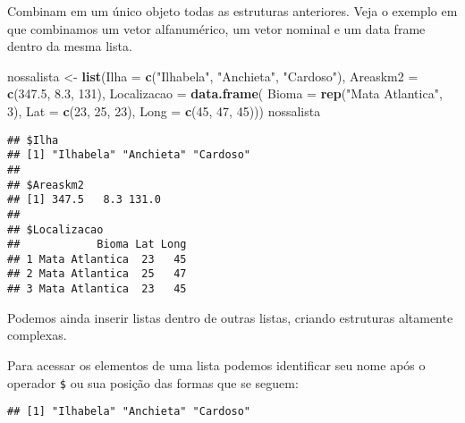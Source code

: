\documentclass[
]{book}
\newenvironment{Shaded}{\begin{snugshade}}{\end{snugshade}}
\newcommand{\DataTypeTok}[1]{\textcolor[rgb]{0.13,0.29,0.53}{#1}}
\newcommand{\DecValTok}[1]{\textcolor[rgb]{0.00,0.00,0.81}{#1}}
\newcommand{\FloatTok}[1]{\textcolor[rgb]{0.00,0.00,0.81}{#1}}
\newcommand{\KeywordTok}[1]{\textcolor[rgb]{0.13,0.29,0.53}{\textbf{#1}}}
\newcommand{\NormalTok}[1]{#1}
\newcommand{\OperatorTok}[1]{\textcolor[rgb]{0.81,0.36,0.00}{\textbf{#1}}}
\newcommand{\StringTok}[1]{\textcolor[rgb]{0.31,0.60,0.02}{#1}}
\begin{document}
Combinam em um único objeto todas as estruturas anteriores. Veja o exemplo em que combinamos um vetor alfanumérico, um vetor nominal e um data frame dentro da mesma lista.

\begin{Shaded}
\begin{Highlighting}[]
\NormalTok{nossalista <-}\StringTok{ }\KeywordTok{list}\NormalTok{(}\DataTypeTok{Ilha =} \KeywordTok{c}\NormalTok{(}\StringTok{"Ilhabela"}\NormalTok{, }\StringTok{"Anchieta"}\NormalTok{, }\StringTok{"Cardoso"}\NormalTok{), }
                  \DataTypeTok{Areaskm2 =} \KeywordTok{c}\NormalTok{(}\FloatTok{347.5}\NormalTok{, }\FloatTok{8.3}\NormalTok{, }\DecValTok{131}\NormalTok{), }
                  \DataTypeTok{Localizacao =} \KeywordTok{data.frame}\NormalTok{(}
                    \DataTypeTok{Bioma =} \KeywordTok{rep}\NormalTok{(}\StringTok{"Mata Atlantica"}\NormalTok{, }\DecValTok{3}\NormalTok{),}
                  \DataTypeTok{Lat =} \KeywordTok{c}\NormalTok{(}\DecValTok{23}\NormalTok{, }\DecValTok{25}\NormalTok{, }\DecValTok{23}\NormalTok{),}
                  \DataTypeTok{Long =} \KeywordTok{c}\NormalTok{(}\DecValTok{45}\NormalTok{, }\DecValTok{47}\NormalTok{, }\DecValTok{45}\NormalTok{)))}
\NormalTok{nossalista}
\end{Highlighting}
\end{Shaded}

\begin{verbatim}
## $Ilha
## [1] "Ilhabela" "Anchieta" "Cardoso" 
## 
## $Areaskm2
## [1] 347.5   8.3 131.0
## 
## $Localizacao
##            Bioma Lat Long
## 1 Mata Atlantica  23   45
## 2 Mata Atlantica  25   47
## 3 Mata Atlantica  23   45
\end{verbatim}

Podemos ainda inserir listas dentro de outras listas, criando estruturas altamente complexas.

Para acessar os elementos de uma lista podemos identificar seu nome após o operador \texttt{\$} ou sua posição das formas que se seguem:

\begin{Shaded}
\end{Shaded}

\begin{verbatim}
## [1] "Ilhabela" "Anchieta" "Cardoso"
\end{verbatim}
\end{document}
